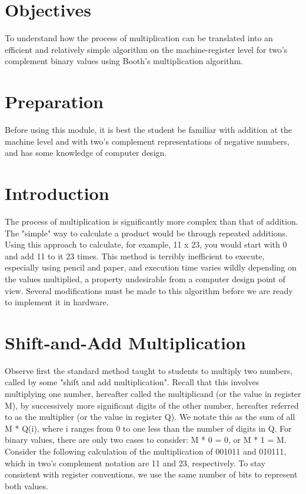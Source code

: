 \documentclass{article}
\begin{document}
\section{Objectives}
To understand how the process of multiplication can be translated into an efficient and relatively simple algorithm on the machine-register level for two's complement binary values using Booth's multiplication algorithm.

\section{Preparation}
Before using this module, it is best the student be familiar with addition at the machine level and with two's complement representations of negative numbers, and has some knowledge of computer design.

\section{Introduction}
The process of multiplication is significantly more complex than that of addition. The "simple" way to calculate a product would be through repeated additions. Using this approach to calculate, for example, 11 x 23, you would start with 0 and add 11 to it 23 times. This method is terribly inefficient to execute, especially using pencil and paper, and execution time varies wildly depending on the values multiplied, a property undesirable from a computer design point of view. Several modifications must be made to this algorithm before we are ready to implement it in hardware.

\section{Shift-and-Add Multiplication}
Observe first the standard method taught to students to multiply two numbers, called by some "shift and add multiplication". Recall that this involves multiplying one number, hereafter called the multiplicand (or the value in register M), by successively more significant digits of the other number, hereafter referred to as the multiplier (or the value in register Q). We notate this as the sum of all M * Q(i), where i ranges from 0 to one less than the number of digits in Q. For binary values, there are only two cases to consider: M * 0 = 0, or M * 1 = M. Consider the following calculation of the multiplication of 001011 and 010111, which in two's complement notation are 11 and 23, respectively. To stay consistent with register conventions, we use the same number of bits to represent both values. %
\end{document}
